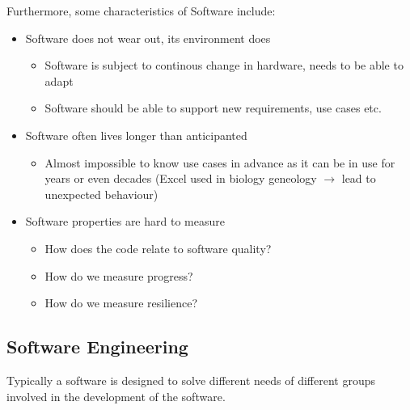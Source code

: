 \documentclass[
../../Software_Engineering_Summary.tex,
]
{subfiles}
\begin{document}
Furthermore, some characteristics of Software include:

\begin{defbox*}
    \begin{itemize}
        \item Software does not wear out, its environment does
        \begin{itemize}
            \item Software is subject to continous change in hardware, needs to be able to adapt
            \item Software should be able to support new requirements, use cases etc.
        \end{itemize}
        \item Software often lives longer than anticipanted
        \begin{itemize}
            \item Almost impossible to know use cases in advance as it can be in use for years or even decades (Excel used in biology geneology $\rightarrow$ lead to unexpected behaviour)
        \end{itemize}
        \item Software properties are hard to measure
        \begin{itemize}
            \item How does the code relate to software quality?
            \item How do we measure progress?
            \item How do we measure resilience?
        \end{itemize}
    \end{itemize}
\end{defbox*}
\newpage
\subsection{Software Engineering}
Typically a software is designed to solve different needs of different groups involved in the development of the software.
\end{document}
